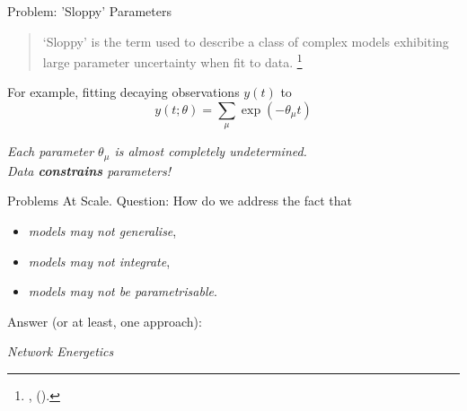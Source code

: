 \documentclass[11pt,reqno]{beamer}
\newcommand{\fcite}[1]{
\footnote{\cite{#1}, (\citeyear{#1}).}
}
\begin{document}
\begin{frame}{Problem: 'Sloppy' Parameters}
\begin{block}{}
\begin{quote}`Sloppy' is the term used to describe a class of complex models exhibiting large
parameter uncertainty when fit to data.\fcite{Transtrum2015}
\end{quote}

\end{block}

\vfill

For example, fitting decaying observations $y(t)$ to
\[
y(t;\theta) = \sum_\mu \exp(-\theta_\mu t) 
\]
\begin{center}
\emph{Each parameter $\theta_\mu$ is almost completely undetermined.}\\
\emph{Data {\bf constrains} parameters!}
\end{center}
\end{frame}
\begin{frame}{Problems At Scale.}
Question: How do we address the fact that
\begin{itemize}
	\item \emph{models may not generalise},
	\item \emph{models may not integrate},
	\item \emph{models may not be parametrisable}.
\end{itemize}
\vfill
\pause
Answer (or at least, one approach):
\begin{center}
\emph{Network Energetics}
\end{center}
\end{frame}
\end{document}
